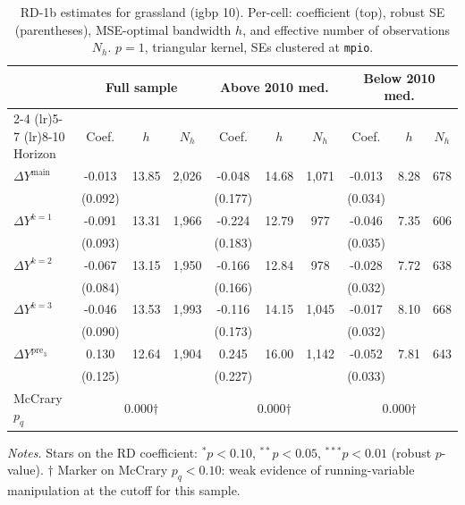 \documentclass[11pt]{article}
\begin{document}
\begin{table}[H]
\centering
\scriptsize
\caption{RD-1b estimates for grassland (igbp 10). Per-cell: coefficient
(top), robust SE (parentheses), MSE-optimal bandwidth $h$, and
effective number of observations $N_h$. $p=1$, triangular kernel,
SEs clustered at \texttt{mpio}.}
\label{tab:rdplot_rd1b_grassland}
\begin{tabular}{l ccc ccc ccc}
\toprule
 & \multicolumn{3}{c}{Full sample} & \multicolumn{3}{c}{Above 2010 med.} & \multicolumn{3}{c}{Below 2010 med.} \\
\cmidrule(lr){2-4} \cmidrule(lr){5-7} \cmidrule(lr){8-10}
Horizon & Coef. & $h$ & $N_h$ & Coef. & $h$ & $N_h$ & Coef. & $h$ & $N_h$ \\
\midrule
$\Delta Y^{\text{main}}$ & -0.013 & 13.85 & 2,026 & -0.048 & 14.68 & 1,071 & -0.013 & 8.28 & 678 \\
 & (0.092) &  &  & (0.177) &  &  & (0.034) &  &  \\
\addlinespace[1pt]
$\Delta Y^{k=1}$ & -0.091 & 13.31 & 1,966 & -0.224 & 12.79 & 977 & -0.046 & 7.35 & 606 \\
 & (0.093) &  &  & (0.183) &  &  & (0.035) &  &  \\
\addlinespace[1pt]
$\Delta Y^{k=2}$ & -0.067 & 13.15 & 1,950 & -0.166 & 12.84 & 978 & -0.028 & 7.72 & 638 \\
 & (0.084) &  &  & (0.166) &  &  & (0.032) &  &  \\
\addlinespace[1pt]
$\Delta Y^{k=3}$ & -0.046 & 13.53 & 1,993 & -0.116 & 14.15 & 1,045 & -0.017 & 8.10 & 668 \\
 & (0.090) &  &  & (0.173) &  &  & (0.032) &  &  \\
\addlinespace[1pt]
$\Delta Y^{\text{pre}_3}$ & 0.130 & 12.64 & 1,904 & 0.245 & 16.00 & 1,142 & -0.052 & 7.81 & 643 \\
 & (0.125) &  &  & (0.227) &  &  & (0.033) &  &  \\
\addlinespace[1pt]
\midrule
McCrary $p_q$ & \multicolumn{3}{c}{0.000$\dagger$} & \multicolumn{3}{c}{0.000$\dagger$} & \multicolumn{3}{c}{0.000$\dagger$} \\
\bottomrule
\end{tabular}
\begin{flushleft}\footnotesize
\textit{Notes.} Stars on the RD coefficient: $^{*}p<0.10$,
$^{**}p<0.05$, $^{***}p<0.01$ (robust $p$-value).
$\dagger$ Marker on McCrary $p_q<0.10$: weak evidence of running-variable manipulation at the cutoff for this sample.\\
\end{flushleft}
\end{table}
\end{document}

